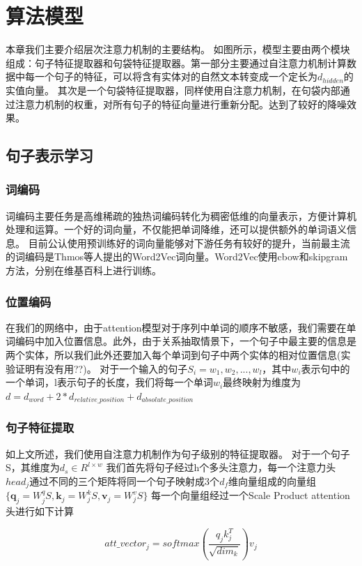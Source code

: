 \documentclass[UTF8]{csoarticle}
\begin{document}
\section{算法模型}
本章我们主要介绍层次注意力机制的主要结构。
如图所示，模型主要由两个模块组成：句子特征提取器和句袋特征提取器。第一部分主要通过自注意力机制计算数据中每一个句子的特征，可以将含有实体对的自然文本转变成一个定长为$d_{hidden}$的实值向量。
其次是一个句袋特征提取器，同样使用自注意力机制，在句袋内部通过注意力机制的权重，对所有句子的特征向量进行重新分配。达到了较好的降噪效果。
\subsection{句子表示学习}
\subsubsection{词编码}
词编码主要任务是高维稀疏的独热词编码转化为稠密低维的向量表示，方便计算机处理和运算。一个好的词向量，不仅能把单词降维，还可以提供额外的单词语义信息。
目前公认使用预训练好的词向量能够对下游任务有较好的提升，当前最主流的词编码是Thmos\cite{bib6}等人提出的Word2Vec词向量。Word2Vec使用cbow和skipgram方法，分别在维基百科上进行训练。
\subsubsection{位置编码}
在我们的网络中，由于attention模型对于序列中单词的顺序不敏感，我们需要在单词编码中加入位置信息。此外，由于关系抽取情景下，一个句子中最主要的信息是两个实体，所以我们此外还要加入每个单词到句子中两个实体的相对位置信息(实验证明有没有用??)。
对于一个输入的句子$S_i={w_1, w_2, ..., w_l}$，其中$w_i$表示句中的一个单词，l表示句子的长度，我们将每一个单词$w_i$最终映射为维度为$ d=d_{word} + 2*d_{relative\_position} + d_{absolute\_position}$

\subsubsection{句子特征提取}

如上文所述，我们使用自注意力机制作为句子级别的特征提取器。
对于一个句子S，其维度为$d_s\in R^{l\times w}$
我们首先将句子经过h个多头注意力，每一个注意力头$head_j$通过不同的三个矩阵将同一个句子映射成3个$d_{f}$维向量组成的向量组$\{\boldsymbol q_j=W_j^{q}S, \boldsymbol k_j=W_j^{k}S, \boldsymbol v_j=W_j^{v}S\}$
每一个向量组经过一个Scale Product attention头进行如下计算

\[ att\_vector_{j} = softmax(\frac{q_{j} k_{j}^{T} }{\sqrt{dim_k}})v_{j}\]
\end{document}
